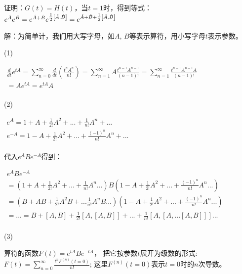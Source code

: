 证明：$G(t) = H(t)$，当$t = 1$时，得到等式：$e^{\hat A} e^{\hat B}  = e^{\hat A + \hat B} e^{{\textstyle{1 \over 2}}\left[ {\hat A,\hat B} \right]}  = e^{\hat A + \hat B + {\textstyle{1 \over 2}}\left[ {\hat A,\hat B} \right]} $

解：为简单计，我们用大写字母，如$A$,
$B$等表示算符，用小写字母$t$表示参数。

(1)

$\begin{array}{l}
 \frac{d}{{dt}}e^{tA}  = \sum\limits_{n = 0}^\infty  {\frac{d}{{dt}}\left( {\frac{{t^n A^n }}{{n!}}} \right)}  = \sum\limits_{n = 1}^\infty  {A\frac{{t^{n - 1} A^{n - 1} }}{{\left( {n - 1} \right)!}}}  = \sum\limits_{n = 1}^\infty  {\frac{{t^{n - 1} A^{n - 1} A}}{{\left( {n - 1} \right)!}}}  \\
  = Ae^{tA}  = e^{tA} A \\
 \end{array}$

 (2)

 $\begin{array}{l}
 e^A  = 1 + A + \frac{1}{{2!}}A^2  + ... + \frac{1}{{n!}}A^n  + ... \\
 e^{ - A}  = 1 - A + \frac{1}{{2!}}A^2  + ... + \frac{{\left( { - 1} \right)^n }}{{n!}}A^n  + ... \\
 \end{array}$


代入$e^A Be^{ - A} $得到：

$\begin{array}{l}
 e^A Be^{ - A}  \\
  = \left( {1 + A + \frac{1}{{2!}}A^2  + ... + \frac{1}{{n!}}A^n   ...} \right)B\left( {1 - A + \frac{1}{{2!}}A^2  + ... + \frac{{\left( { - 1} \right)^n }}{{n!}}A^n   ...} \right) \\
  = \left( {B + AB + \frac{1}{{2!}}A^2 B + ...\frac{1}{{n!}}A^n B  ...} \right)\left( {1 - A + \frac{1}{{2!}}A^2  + ... + \frac{{\left( { - 1} \right)^n }}{{n!}}A^n   ...} \right) \\
  = ... = B + \left[ {A,B} \right] + \frac{1}{{2!}}\left[ {A,\left[ {A,B} \right]} \right] + ... + \frac{1}{{n!}}\left[ {A,\left[ {A,...\left[ {A,B} \right]} \right]} \right]  ... \\
 \end{array}$

(3)

算符的函数$F\left( t \right) = e^{tA} Be^{ - tA} $，
把它按参数$t$展开为级数的形式:
$F\left( t \right) = \sum\limits_{n = 0}^\infty  {\frac{{t^n F^{(n)} \left( {t = 0} \right)}}{{n!}}} $;
这里$F^{(n)} \left( {t = 0} \right)$表示$t=0$时的$n$次导数。

